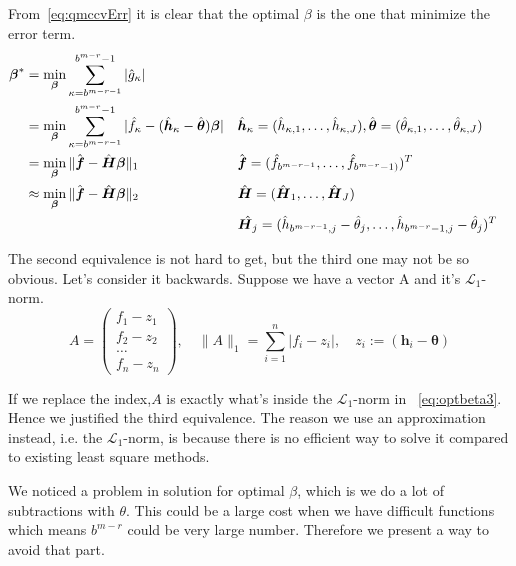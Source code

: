 From~\eqref{eq:qmccvErr} it is clear that the optimal $\beta$ is the one that minimize the error term. 
\begin{align}
    \label{eq:optbeta1}
    \boldsymbol{\beta}^*
    &=\min_{\boldsymbol{\beta}}\sum_{\kappa=b^{m-r-1}}^{b^{m-r}-1} |\hat{g}_{\kappa}|\\
    \label{eq:optbeta2}
    &=\min_{\boldsymbol{\beta}}\sum_{\kappa=b^{m-r-1}}^{b^{m-r}-1}|\hat{f}_\kappa
    -(\hat{\boldsymbol{h}}_\kappa - \hat{\boldsymbol{\theta}})\boldsymbol{\boldsymbol{\beta}}|
    && \hat{\boldsymbol{h}}_\kappa=(\hat{h}_{\kappa,1},\dots, \hat{h}_{\kappa,J}),
    \hat{\boldsymbol{\theta}}=(\hat{\theta}_{\kappa,1},\dots,\hat{\theta}_{\kappa,J})\\
    \label{eq:optbeta3}
    &=\min_{\boldsymbol{\beta}}\|\hat{\boldsymbol{f}}-\hat{\boldsymbol{H}}\boldsymbol{\beta}\|_1
    && \hat{\boldsymbol{f}}= (\hat{f}_{b^{m-r-1}},\dots,\hat{f}_{b^{m-r}-1)})^T \\
    \label{eq:optbeta4}
    &\approx\min_{\boldsymbol{\beta}}\|\hat{\boldsymbol{f}}-\hat{\boldsymbol{H}}\boldsymbol{\beta}\|_2
    && \hat{\boldsymbol{H}}= (\hat{\boldsymbol{H}}_1, \dots, \hat{\boldsymbol{H}}_J)\\
    & \notag 
    &&\hat{\boldsymbol{H}_j}=(\hat{h}_{b^{m-r-1},j}-\hat{\theta}_j,\dots, \hat{h}_{b^{m-r}-1,j}-\hat{\theta}_j)^T
\end{align}

The second equivalence is not hard to get, but the third one may not be so obvious. Let's consider it backwards. Suppose we have a vector A and it's $\mathcal{L}_1$-norm.
\[
   A=
    \begin{pmatrix}
        f_1-z_1\\
        f_2-z_2\\
        \hdots\\
        f_n-z_n
    \end{pmatrix},\quad
    \|A\|_1=\sum_{i=1}^{n}|f_i-z_i|, \quad
    z_i:=(\boldsymbol{h}_i-\boldsymbol{\theta})
\]

If we replace the index,$A$ is exactly what's inside the $\mathcal{L}_1$-norm in ~\eqref{eq:optbeta3}. 
Hence we justified the third equivalence. The reason we use an approximation instead, i.e. the $\mathcal{L}_1$-norm, is because there is no efficient way to solve it compared to existing least square methods.


We noticed a problem in solution for optimal $\beta$, which is we do a lot of subtractions with $\theta$. This could be a large cost when we have difficult functions which means $b^{m-r}$ could be very large number. Therefore we present a way to avoid that part.

